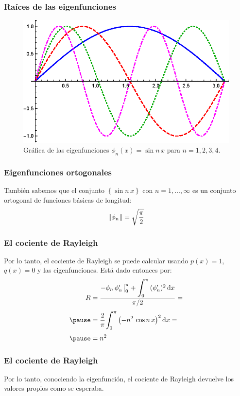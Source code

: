 \documentclass[12pt]{beamer}
\begin{document}
\begin{frame}
\frametitle{Raíces de las eigenfunciones}
\begin{figure}[H]
\centering
\includegraphics[scale=1]{Imagenes/Eigenfunciones_Sin_nx.eps}
\caption{Gráfica de las eigenfunciones $\phi_{n} (x) = \sin n \,x$ para $n = 1, 2, 3, 4$.}
\label{fig:figura_04_01}
\end{figure}
\end{frame}
\begin{frame}
\frametitle{Eigenfunciones ortogonales}
También sabemos que el conjunto $\left\{ \sin n \, x \right\}$ con $n = 1, \ldots, \infty$ es un conjunto ortogonal de funciones básicas de longitud:
\pause
\begin{align*}
\norm{\phi_{n}} = \sqrt{\dfrac{\pi}{2}}
\end{align*}
\end{frame}
\begin{frame}
\frametitle{El cociente de Rayleigh}
Por lo tanto, el cociente de Rayleigh se puede calcular usando $p(x) = 1$, $q (x) = 0$ y las eigenfunciones. \pause Está dado entonces por:
\pause
\begin{eqnarray}
\begin{aligned}[b]
R &= \dfrac{- \phi_{n} \, \pderivada{\phi}_{n} \eval_{0}^{\pi} + \scaleint{6ex}_{\bs 0}^{\pi} \, (\pderivada{\phi}_{n})^{2} \dd{x}}{\pi/2} = \\[0.35em] \pause
&= \dfrac{2}{\pi} \scaleint{6ex}_{\bs 0}^{\pi} \left( - n^{2} \, \cos n \, x \right)^{2} \dd{x} = \\[0.35em] \pause
&= n^{2}
\end{aligned}
\label{eq:ecuacion_04_13}
\end{eqnarray}
\end{frame}
\begin{frame}
\frametitle{El cociente de Rayleigh}
Por lo tanto, conociendo la eigenfunción, el cociente de Rayleigh devuelve los valores propios como se esperaba.
\end{frame}
\end{document}
